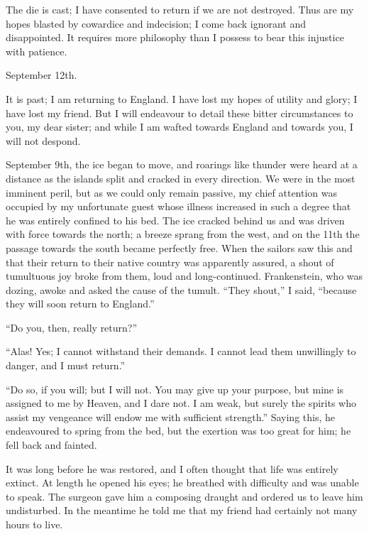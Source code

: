 \documentclass[12pt,openright]{book}
\begin{document}
The die is cast; I have consented to return if we are not destroyed. Thus are my hopes blasted by cowardice and indecision; I come back ignorant and disappointed. It requires more philosophy than I possess to bear this injustice with patience.

September 12th.

It is past; I am returning to England. I have lost my hopes of utility and glory; I have lost my friend. But I will endeavour to detail these bitter circumstances to you, my dear sister; and while I am wafted towards England and towards you, I will not despond.

September 9th, the ice began to move, and roarings like thunder were heard at a distance as the islands split and cracked in every direction. We were in the most imminent peril, but as we could only remain passive, my chief attention was occupied by my unfortunate guest whose illness increased in such a degree that he was entirely confined to his bed. The ice cracked behind us and was driven with force towards the north; a breeze sprang from the west, and on the 11th the passage towards the south became perfectly free. When the sailors saw this and that their return to their native country was apparently assured, a shout of tumultuous joy broke from them, loud and long-continued. Frankenstein, who was dozing, awoke and asked the cause of the tumult. “They shout,” I said, “because they will soon return to England.”

“Do you, then, really return?”

“Alas! Yes; I cannot withstand their demands. I cannot lead them unwillingly to danger, and I must return.”

“Do so, if you will; but I will not. You may give up your purpose, but mine is assigned to me by Heaven, and I dare not. I am weak, but surely the spirits who assist my vengeance will endow me with sufficient strength.” Saying this, he endeavoured to spring from the bed, but the exertion was too great for him; he fell back and fainted.

It was long before he was restored, and I often thought that life was entirely extinct. At length he opened his eyes; he breathed with difficulty and was unable to speak. The surgeon gave him a composing draught and ordered us to leave him undisturbed. In the meantime he told me that my friend had certainly not many hours to live.
\end{document}
